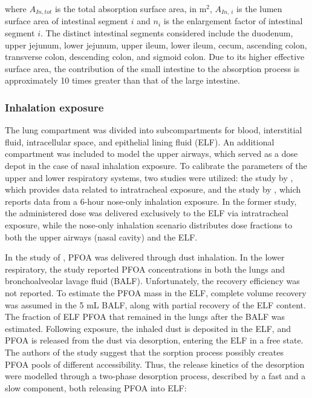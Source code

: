 \documentclass[preprint,12pt,authoryear]{elsarticle}
\begin{document}
where $A_{In,tot}$ is the total absorption surface area, in $\text{m}^2$, $A_{In, \, i}$ is the lumen surface area of intestinal segment $i$ and $n_i$ is the enlargement factor of intestinal segment $i$. The distinct intestinal segments considered include the duodenum, upper jejunum, lower jejunum, upper ileum, lower ileum, cecum, ascending colon, transverse colon, descending colon, and sigmoid colon. Due to its higher effective surface area, the contribution of the small intestine to the absorption process is approximately 10 times greater than that of the large intestine.

\subsubsection{Inhalation exposure} 

The lung compartment was divided into subcompartments for blood, interstitial fluid, intracellular space, and epithelial lining fluid (ELF). An additional compartment was included to model the upper airways, which served as a dose depot in the case of nasal inhalation exposure. To calibrate the parameters of the upper and lower respiratory systems, two studies were utilized: the study by \citet{gustafsson_2022}, which provides data related to intratracheal exposure, and the study by \citet{hinderliter_2006}, which reports data from a 6-hour nose-only inhalation exposure. In the former study, the administered dose was delivered exclusively to the ELF via intratracheal exposure, while the nose-only inhalation scenario distributes dose fractions to both the upper airways (nasal cavity) and the ELF.

In the study of \citet{gustafsson_2022}, PFOA was delivered through dust inhalation. In the lower respiratory, the study reported PFOA concentrations in both the lungs and bronchoalveolar lavage fluid (BALF). Unfortunately, the recovery efficiency was not reported. To estimate the PFOA mass in the ELF, complete volume recovery was assumed in the 5 mL BALF, along with partial recovery of the ELF content. The fraction of ELF PFOA that remained in the lungs after the BALF was estimated. Following exposure, the inhaled dust is deposited in the ELF, and PFOA is released from the dust via desorption, entering the ELF in a free state. The authors of the study suggest that the sorption process possibly creates PFOA pools of different accessibility. Thus, the release kinetics of the desorption were modelled through a two-phase desorption process, described by a fast and a slow component, both releasing PFOA into ELF:
\end{document}

